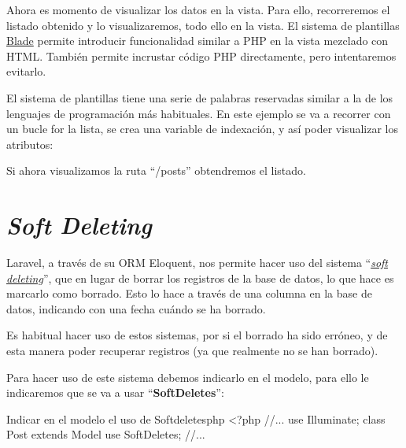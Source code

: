 
Ahora es momento de visualizar los datos en la vista. Para ello, recorreremos el listado obtenido y lo visualizaremos, todo ello en la vista. El sistema de plantillas \href{https://laravel.com/docs/10.x/blade}{Blade} permite introducir funcionalidad similar a PHP en la vista mezclado con HTML. También permite incrustar código PHP directamente, pero intentaremos evitarlo.

El sistema de plantillas tiene una serie de palabras reservadas similar a la de los lenguajes de programación más habituales. En este ejemplo se va a recorrer con un bucle for la lista, se crea una variable de indexación, y así poder visualizar los atributos:


Si ahora visualizamos la ruta “/posts” obtendremos el listado.



\chapter{\textit{Soft Deleting}}

Laravel, a través de su ORM Eloquent, nos permite hacer uso del sistema “\textit{\href{https://laravel.com/docs/10.x/eloquent\#soft-deleting}{soft deleting}}”, que en lugar de borrar los registros de la base de datos, lo que hace es marcarlo como borrado. Esto lo hace a través de una columna en la base de datos, indicando con una fecha cuándo se ha borrado.

Es habitual hacer uso de estos sistemas, por si el borrado ha sido erróneo, y de esta manera poder recuperar registros (ya que realmente no se han borrado).

Para hacer uso de este sistema debemos indicarlo en el modelo, para ello le indicaremos que se va a usar “\textbf{SoftDeletes}”:

\begin{mycode}{Indicar en el modelo el uso de Softdeletes}{php}{}
<?php
//...
use Illuminate\Database\Eloquent\SoftDeletes;
class Post extends Model{
    use SoftDeletes;
    //...
}
\end{mycode}


